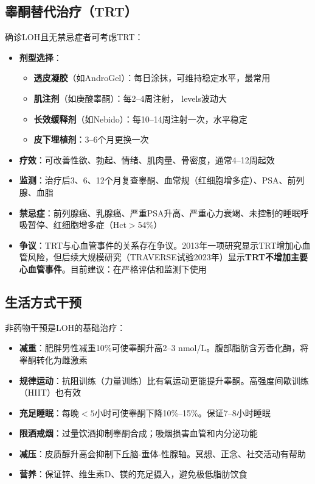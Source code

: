 \subsection{睾酮替代治疗（TRT）}

确诊LOH且无禁忌症者可考虑TRT：

\begin{itemize}[leftmargin=2cm]
	\item \textbf{剂型选择}：
		\begin{itemize}
		\item \textbf{透皮凝胶}（如AndroGel）：每日涂抹，可维持稳定水平，最常用
		\item \textbf{肌注剂}（如庚酸睾酮）：每2--4周注射， levels波动大
		\item \textbf{长效缓释剂}（如Nebido）：每10--14周注射一次，水平稳定
		\item \textbf{皮下埋植剂}：3--6个月更换一次
		\end{itemize}
	\item \textbf{疗效}：可改善性欲、勃起、情绪、肌肉量、骨密度，通常4--12周起效
	\item \textbf{监测}：治疗后3、6、12个月复查睾酮、血常规（红细胞增多症）、PSA、前列腺、血脂
	\item \textbf{禁忌症}：前列腺癌、乳腺癌、严重PSA升高、严重心力衰竭、未控制的睡眠呼吸暂停、红细胞增多症（Hct$>$54\%）
	\item \textbf{争议}：TRT与心血管事件的关系存在争议。2013年一项研究显示TRT增加心血管风险，但后续大规模研究（TRAVERSE试验2023年）显示\textbf{TRT不增加主要心血管事件}。目前建议：在严格评估和监测下使用
\end{itemize}

\subsection{生活方式干预}

非药物干预是LOH的基础治疗：

\begin{itemize}[leftmargin=2cm]
	\item \textbf{减重}：肥胖男性减重10\%可使睾酮升高2--3 nmol/L。腹部脂肪含芳香化酶，将睾酮转化为雌激素
	\item \textbf{规律运动}：抗阻训练（力量训练）比有氧运动更能提升睾酮。高强度间歇训练（HIIT）也有效
	\item \textbf{充足睡眠}：每晚$<5$小时可使睾酮下降10\%--15\%。保证7--8小时睡眠
	\item \textbf{限酒戒烟}：过量饮酒抑制睾酮合成；吸烟损害血管和内分泌功能
	\item \textbf{减压}：皮质醇升高会抑制下丘脑-垂体-性腺轴。冥想、正念、社交活动有帮助
	\item \textbf{营养}：保证锌、维生素D、镁的充足摄入，避免极低脂肪饮食
\end{itemize}

